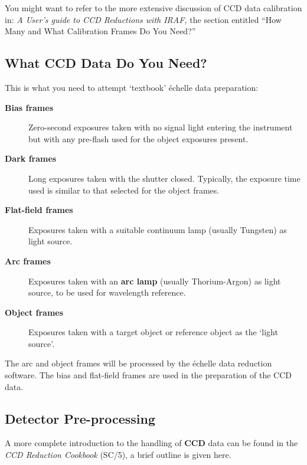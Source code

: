 \documentclass[twoside,11pt]{article}
\newcommand{\htmlref}[2]{#1}
\newcommand{\xref}[3]{#1}
\begin{document}
You might want to refer to the more extensive discussion of CCD data
calibration in: {\sl A User's guide to CCD Reductions with IRAF,} the
section entitled ``How Many and What Calibration Frames Do You Need?''


\subsection{What CCD Data Do You Need?}

This is what you need to attempt `textbook' \'{e}chelle
data preparation:

\begin{description}

\item [{\bf Bias frames}]
      Zero-second exposures taken with no signal light entering the
      instrument but with any pre-flash used for the object exposures
      present.

\item [{\bf Dark frames}]
      Long exposures taken with the shutter closed.  Typically, the
      exposure time used is similar to that selected for the object
      frames.

\item [{\bf Flat-field frames}]
      Exposures taken with a suitable continuum lamp
      (usually Tungsten) as light source.

\item [{\bf Arc frames}]
      Exposures taken with an \htmlref{{\bf arc lamp}}{gl_arc}
      (usually Thorium-Argon) as
      light source, to be used for wavelength reference.

\item [{\bf Object frames}]
      Exposures taken with a target object or reference object as the
      `light source'.

\end{description}

The arc and object frames will be processed by the \'{e}chelle data
reduction software.  The bias and flat-field frames are used in the
preparation of the CCD data.


\subsection{Detector Pre-processing}

A more complete introduction to the handling of \htmlref{{\bf CCD}}{gl_ccd}
data can be found in the \xref{{\sl CCD Reduction Cookbook} (SC/5)}{sc5}{},
a brief outline is given here.
\end{document}
